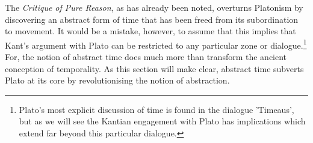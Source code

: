 The \textit{Critique of Pure Reason}, as has already been noted, overturns Platonism by discovering an abstract form of time that has been freed from its subordination to movement. It would be a mistake, however, to assume that this implies that Kant's argument with Plato can be restricted to any particular zone or dialogue.\footnote{Plato's most explicit discussion of time is found in the dialogue 'Timeaus', but as we will see the Kantian engagement with Plato has implications which extend far beyond this particular dialogue.} For, the notion of abstract time does much more than transform the ancient conception of temporality. As this section will make clear, abstract time subverts Plato at its core by revolutionising the notion of abstraction.

